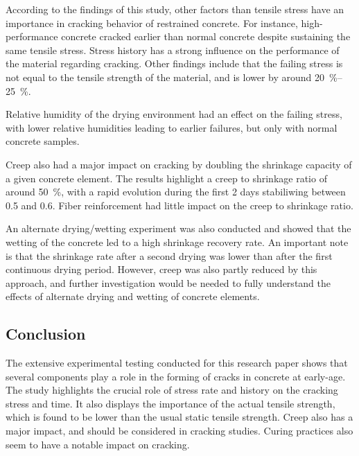 \documentclass{report}
\begin{document}
According to the findings of this study, other factors than tensile stress have
an importance in cracking behavior of restrained concrete. For instance,
high-performance concrete cracked earlier than normal concrete despite
sustaining the same tensile stress. Stress history has a strong influence on
the performance of the material regarding cracking. Other findings include that
the failing stress is not equal to the tensile strength of the material, and is
lower by around \SIrange{20}{25}{\percent}.

Relative humidity of the drying environment had an effect on the failing
stress, with lower relative humidities leading to earlier failures, but only
with normal concrete samples.

Creep also had a major impact on cracking by doubling the shrinkage capacity of
a given concrete element. The results highlight a creep to shrinkage ratio of
around \SI{50}{\percent}, with a rapid evolution during the first 2 days
stabiliwing between \num{0.5} and \num{.6}. Fiber reinforcement had little
impact on the creep to shrinkage ratio.

An alternate drying/wetting experiment was also conducted and showed that the
wetting of the concrete led to a high shrinkage recovery rate. An important
note is that the shrinkage rate after a second drying was lower than after the
first continuous drying period. However, creep was also partly reduced by this
approach, and further investigation would be needed to fully understand the
effects of alternate drying and wetting of concrete elements.

\subsection{Conclusion}

The extensive experimental testing conducted for this research paper shows that
several components play a role in the forming of cracks in concrete at
early-age. The study highlights the crucial role of stress rate and history on
the cracking stress and time. It also displays the importance of the actual
tensile strength, which is found to be lower than the usual static tensile
strength. Creep also has a major impact, and should be considered in cracking
studies. Curing practices also seem to have a notable impact on cracking.

\printbibliography
\end{document}
